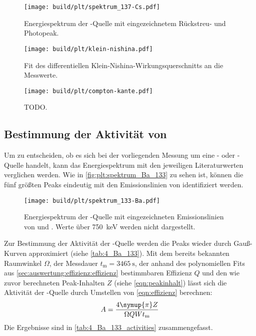 \begin{figure}
    \centering
    \texttt{[image: build/plt/spektrum\_137-Cs.pdf]}
    \caption{Energiespektrum der -Quelle mit eingezeichnetem Rückstreu- und Photopeak.}
    \label{fig:plt:spektrum_Cs_137}
\end{figure}


\begin{figure}
    \centering
    \texttt{[image: build/plt/klein-nishina.pdf]}
    \caption{Fit des differentiellen Klein-Nishina-Wirkungsquerschnitts an die Messwerte.}
    \label{fig:plt:klein_nishina}
\end{figure}

\begin{figure}
    \centering
    \texttt{[image: build/plt/compton-kante.pdf]}
    \caption{TODO.}
    \label{fig:plt:compton_kante}
\end{figure}


\FloatBarrier
\subsection{Bestimmung der Aktivität von } \label{sec:auswertung:Ba_133}
Um zu entscheiden,
ob es sich bei der vorliegenden Messung um eine - oder -Quelle handelt,
kann das Energiespektrum mit den jeweiligen Literaturwerten verglichen werden.
Wie in \autoref{fig:plt:spektrum_Ba_133} zu sehen ist,
können die fünf größten Peaks eindeutig mit den Emissionslinien von  identifiziert werden.

\begin{figure}
    \centering
    \texttt{[image: build/plt/spektrum\_133-Ba.pdf]}
    \caption{
        Energiespektrum der -Quelle mit eingezeichneten Emissionslinien von  und .
        Werte über \SI{750}{\kilo\electronvolt} werden nicht dargestellt.
    }
    \label{fig:plt:spektrum_Ba_133}
\end{figure}

Zur Bestimmung der Aktivität der -Quelle
werden die Peaks wieder durch Gauß-Kurven approximiert
    (siehe \autoref{tab:4_Ba_133}).
Mit
    dem bereits bekannten Raumwinkel $\Omega$,
    der Messdauer $t_\text{m} = \SI{3465}{\second}$,
    der anhand des polynomiellen Fits aus \autoref{sec:auswertung:effizienz:effizienz} bestimmbaren Effizienz $Q$
    und den wie zuvor berechneten Peak-Inhalten $Z$ (siehe \autoref{eqn:peakinhalt})
lässt sich die Aktivität der -Quelle durch Umstellen von \autoref{eqn:effizienz} berechnen:
\begin{equation}
    A = \frac{4 \symup{\pi} Z}{\Omega Q W t_\text{m}}
\end{equation}
Die Ergebnisse sind in \autoref{tab:4_Ba_133_activities} zusammengefasst.

